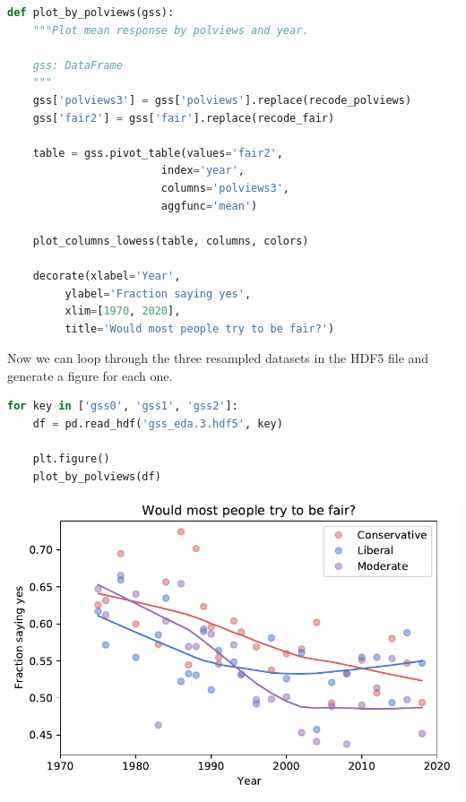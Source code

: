 \begin{lstlisting}[language=Python]
def plot_by_polviews(gss):
    """Plot mean response by polviews and year.
    
    gss: DataFrame
    """
    gss['polviews3'] = gss['polviews'].replace(recode_polviews)
    gss['fair2'] = gss['fair'].replace(recode_fair)
    
    table = gss.pivot_table(values='fair2', 
                        index='year', 
                        columns='polviews3', 
                        aggfunc='mean')

    plot_columns_lowess(table, columns, colors)

    decorate(xlabel='Year',
         ylabel='Fraction saying yes',
         xlim=[1970, 2020],
         title='Would most people try to be fair?')
\end{lstlisting}

Now we can loop through the three resampled datasets in the HDF5 file
and generate a figure for each one.

\begin{lstlisting}[language=Python]
for key in ['gss0', 'gss1', 'gss2']:
    df = pd.read_hdf('gss_eda.3.hdf5', key)

    plt.figure()
    plot_by_polviews(df)
\end{lstlisting}

\begin{center}
\includegraphics[scale=0.75]{chapters/03_outlook_files/03_outlook_60_0.pdf}
\end{center}

